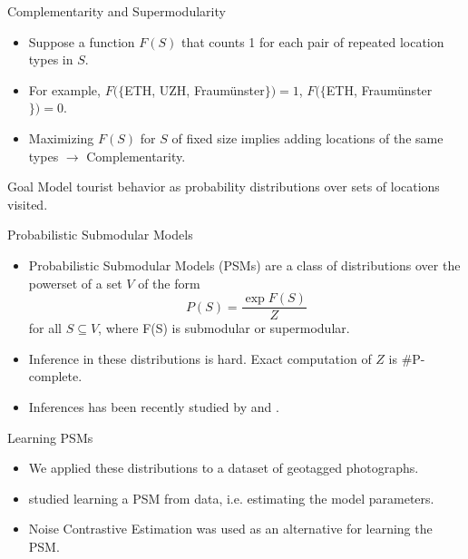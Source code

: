 \documentclass{beamer}
\begin{document}
\begin{frame}{Complementarity and Supermodularity}
  \begin{itemize}
    \item Suppose a function $F(S)$ that counts 1 for each pair of repeated location types in $S$.
    \item For example, $F(\{$ETH, UZH, Fraumünster$\}) = 1$, $F(\{$ETH, Fraumünster$\}) = 0$.
    \item Maximizing $F(S)$ for $S$ of fixed size implies adding locations of the same types $\rightarrow$ Complementarity.
  \end{itemize}
\end{frame}

\begin{frame}{Goal}
  Model tourist behavior as probability distributions over sets of locations visited.
\end{frame}


\begin{frame}{Probabilistic Submodular Models}
  \begin{itemize}
    \item Probabilistic Submodular Models (PSMs) are a class of distributions over the powerset of a set $V$ of the form
      \begin{equation*}
      P(S) = \frac{\exp{F(S)}}{Z}
      \end{equation*}
     for all $S \subseteq V$,  where F(S) is submodular or supermodular.
   
     \item Inference in these distributions is hard. Exact computation of $Z$ is \#P-complete.
     \item Inferences has been recently studied by \cite{djolonga15scalable} and \cite{gotovos15sampling}.
  \end{itemize}
\end{frame}

\begin{frame}{Learning PSMs}
  \begin{itemize}
    \item We applied these distributions to a dataset of geotagged photographs.
    \item \citet{tschiatschek16learning} studied learning a PSM from data, i.e. estimating the model parameters.
    \item Noise Contrastive Estimation was used as an alternative for learning the PSM.
  \end{itemize}
\end{frame}
\end{document}
